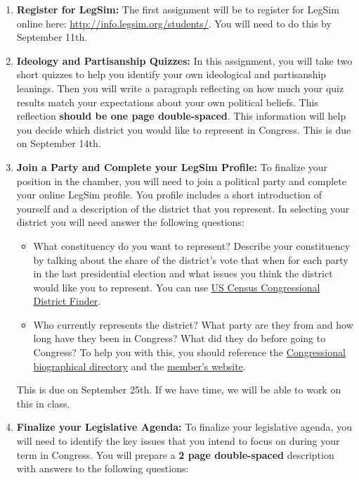 \documentclass[11pt]{article}
\begin{document}
\begin{enumerate}
	\item \textbf{Register for LegSim:} The first assignment will be to register for LegSim online here: \href{http://info.legsim.org/students/}{http://info.legsim.org/students/}. {\color{red} You will need to do this by September 11th.}
	\item \textbf{Ideology and Partisanship Quizzes:} In this assignment, you will take two short quizzes to help you identify your own ideological and partisanship leanings. Then you will write a paragraph reflecting on how much your quiz results match your expectations about your own political beliefs. This reflection \textbf{should be one page double-spaced}. This information will help you decide which district you would like to represent in Congress. {\color{red} This is due on September 14th.}
	\item \textbf{Join a Party and Complete your LegSim Profile:} To finalize your position in the chamber, you will need to join a political party and complete your online LegSim profile. You profile includes a short introduction of yourself and a description of the district that you represent. In selecting your district you will need answer the following questions:
		\begin{itemize}
			\item What constituency do you want to represent? Describe your constituency by talking about the share of the district's vote that when for each party in the last presidential election and what issues you think the district would like you to represent. You can use \href{http://www.census.gov/mycd/}{US Census Congressional District Finder}.
			\item Who currently represents the district? What party are they from and how long have they been in Congress? What did they do before going to Congress? To help you with this, you should reference the \href{https://bioguideretro.congress.gov}{Congressional biographical directory} and the \href{http://www.house.gov/representatives/}{member's website}.
		\end{itemize}
		{\color{red} This is due on September 25th.} If we have time, we will be able to work on this in class. 
	\item \textbf{Finalize your Legislative Agenda:} To finalize your legislative agenda, you will need to identify the key issues that you intend to focus on during your term in Congress. You will prepare a \textbf{2 page double-spaced} description with answers to the following questions:

\end{enumerate}
\end{document}
